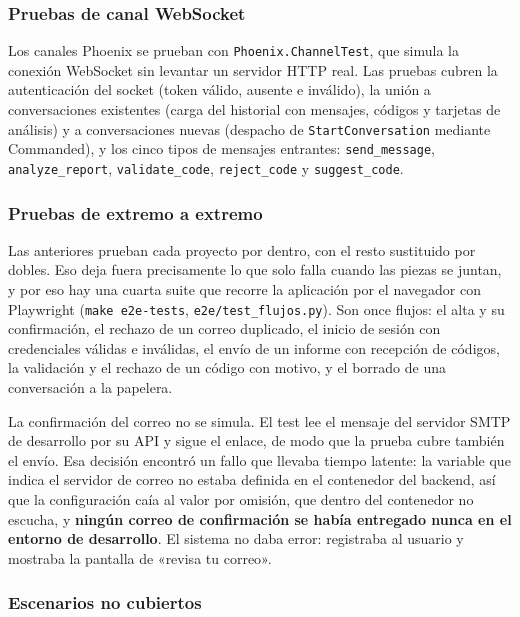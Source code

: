 \subsubsection*{Pruebas de canal WebSocket}

Los canales Phoenix se prueban con \texttt{Phoenix.ChannelTest}, que simula la conexión WebSocket sin levantar un servidor HTTP real. Las pruebas cubren la autenticación del socket (token válido, ausente e inválido), la unión a conversaciones existentes (carga del historial con mensajes, códigos y tarjetas de análisis) y a conversaciones nuevas (despacho de \texttt{StartConversation} mediante Commanded), y los cinco tipos de mensajes entrantes: \texttt{send\_message}, \texttt{analyze\_report}, \texttt{validate\_code}, \texttt{reject\_code} y \texttt{suggest\_code}.

\subsubsection*{Pruebas de extremo a extremo}

Las anteriores prueban cada proyecto por dentro, con el resto sustituido por dobles. Eso deja fuera precisamente lo que solo falla cuando las piezas se juntan, y por eso hay una cuarta suite que recorre la aplicación por el navegador con Playwright (\texttt{make e2e-tests}, \texttt{e2e/test\_flujos.py}). Son once flujos: el alta y su confirmación, el rechazo de un correo duplicado, el inicio de sesión con credenciales válidas e inválidas, el envío de un informe con recepción de códigos, la validación y el rechazo de un código con motivo, y el borrado de una conversación a la papelera.

La confirmación del correo no se simula. El test lee el mensaje del servidor SMTP de desarrollo por su API y sigue el enlace, de modo que la prueba cubre también el envío. Esa decisión encontró un fallo que llevaba tiempo latente: la variable que indica el servidor de correo no estaba definida en el contenedor del backend, así que la configuración caía al valor por omisión, que dentro del contenedor no escucha, y \textbf{ningún correo de confirmación se había entregado nunca en el entorno de desarrollo}. El sistema no daba error: registraba al usuario y mostraba la pantalla de «revisa tu correo».

\subsubsection*{Escenarios no cubiertos}


